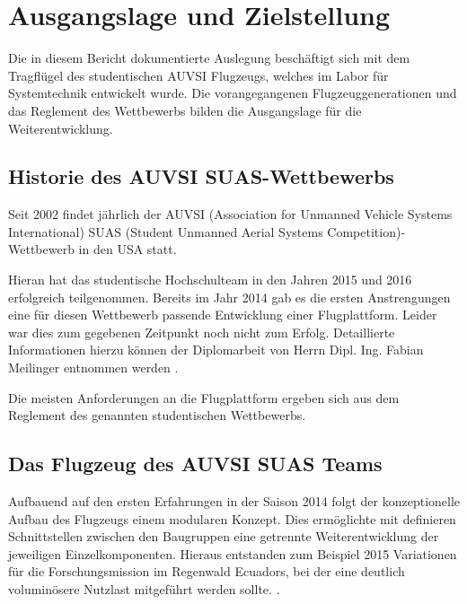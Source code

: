 \chapter{Ausgangslage und Zielstellung}\label{cha:Ausgangslage und Zielstellung}

Die in diesem Bericht dokumentierte Auslegung beschäftigt sich mit dem Tragflügel des studentischen AUVSI Flugzeugs, welches im Labor für Systemtechnik entwickelt wurde. Die vorangegangenen Flugzeuggenerationen und das Reglement des Wettbewerbs bilden die Ausgangslage für die Weiterentwicklung.

\section{Historie des AUVSI SUAS-Wettbewerbs}
Seit 2002 findet jährlich der AUVSI (Association for Unmanned Vehicle Systems International) SUAS (Student Unmanned Aerial Systems Competition)-Wettbewerb in den USA statt.

Hieran hat das studentische Hochschulteam in den Jahren 2015 und 2016 erfolgreich teilgenommen. Bereits im Jahr 2014 gab es die ersten Anstrengungen eine für diesen Wettbewerb passende Entwicklung einer Flugplattform. Leider war dies zum gegebenen Zeitpunkt noch nicht zum Erfolg. Detaillierte Informationen hierzu können der Diplomarbeit von Herrn Dipl. Ing. Fabian Meilinger entnommen werden \cite{Meiling}.

Die meisten Anforderungen an die Flugplattform ergeben sich aus dem Reglement des genannten studentischen Wettbewerbs. 

\clearpage

\section{Das Flugzeug des AUVSI SUAS Teams}

Aufbauend auf den ersten Erfahrungen in der Saison 2014 folgt der konzeptionelle Aufbau des Flugzeugs einem modularen Konzept. Dies ermöglichte mit definieren Schnittstellen zwischen den Baugruppen eine getrennte Weiterentwicklung der jeweiligen Einzelkomponenten. Hieraus entstanden zum Beispiel 2015 Variationen für die Forschungsmission im Regenwald Ecuadors, bei der eine deutlich voluminösere Nutzlast mitgeführt werden sollte. \cite{Niclas}.

